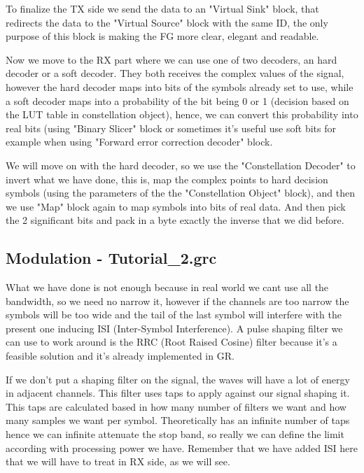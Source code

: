 \documentclass[a4paper, 10pt, conference]{ieeeconf}      %
\begin{document}
        To finalize the TX side we send the data to an "Virtual Sink" block, that redirects the data to the "Virtual Source" block with the same ID, the only purpose of this block is making the FG more clear, elegant and readable.
        
        Now we move to the RX part where we can use one of two decoders, an hard decoder or a soft decoder. They both receives the complex values of the signal, however the hard decoder maps into bits of the symbols already set to use, while a soft decoder maps into a probability of the bit being 0 or 1  (decision based on the LUT table in constellation object), hence, we can convert this probability into real bits (using "Binary Slicer" block or sometimes it's useful use soft bits for example when using "Forward error correction decoder" block. 
        
        We will move on with the hard decoder, so we use the "Constellation Decoder" to invert what we have done, this is, map the complex points to hard decision symbols (using the parameters of the the "Constellation Object" block), and then we use "Map" block again to map symbols into bits of real data. And then pick the 2 significant bits and pack in a byte exactly the inverse that we did before.
        
        
\subsection{Modulation - Tutorial\_2.grc}
    What we have done is not enough because in real world we cant use all the bandwidth, so we need no narrow it, however if the channels are too narrow the symbols will be too wide and the tail of the last symbol will interfere with the present one inducing ISI (Inter-Symbol Interference). A pulse shaping filter we can use to work around is the RRC (Root Raised Cosine) filter because it's a feasible solution and it's already implemented in GR.      
    
   If we don't put a shaping filter on the signal, the waves will have a lot of energy in adjacent channels. This filter uses taps to apply against our signal shaping it. This taps are calculated based in how many number of filters we want and how many samples we want per symbol. Theoretically has an infinite number of taps hence we can infinite attenuate the stop band, so really we can define the limit according with processing power we have. Remember that we have added ISI here that we will have to treat in RX side, as we will see.
   
\end{document}
